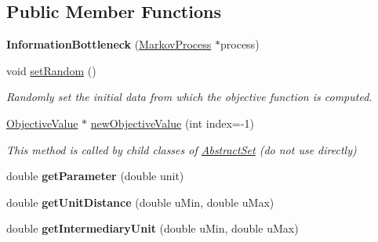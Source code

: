 \subsection*{Public Member Functions}
\begin{DoxyCompactItemize}
\item 
\hypertarget{classInformationBottleneck_aa2b0adc85665a04330d1356bf77097b6}{{\bfseries Information\-Bottleneck} (\hyperlink{classMarkovProcess}{Markov\-Process} $\ast$process)}\label{classInformationBottleneck_aa2b0adc85665a04330d1356bf77097b6}

\item 
\hypertarget{classInformationBottleneck_a10e4ace575f79977f3f6d2f39403dd84}{void \hyperlink{classInformationBottleneck_a10e4ace575f79977f3f6d2f39403dd84}{set\-Random} ()}\label{classInformationBottleneck_a10e4ace575f79977f3f6d2f39403dd84}

\begin{DoxyCompactList}\small\item\em Randomly set the initial data from which the objective function is computed. \end{DoxyCompactList}\item 
\hypertarget{classInformationBottleneck_af710cb93d1be643a5f67c5d879669b8b}{\hyperlink{classObjectiveValue}{Objective\-Value} $\ast$ \hyperlink{classInformationBottleneck_af710cb93d1be643a5f67c5d879669b8b}{new\-Objective\-Value} (int index=-\/1)}\label{classInformationBottleneck_af710cb93d1be643a5f67c5d879669b8b}

\begin{DoxyCompactList}\small\item\em This method is called by child classes of \hyperlink{classAbstractSet}{Abstract\-Set} (do not use directly) \end{DoxyCompactList}\item 
\hypertarget{classInformationBottleneck_ab3ccf81c8633628cd1a4cc37de61a95b}{double {\bfseries get\-Parameter} (double unit)}\label{classInformationBottleneck_ab3ccf81c8633628cd1a4cc37de61a95b}

\item 
\hypertarget{classInformationBottleneck_a2b29527ef1700808f67ceb1b821a1626}{double {\bfseries get\-Unit\-Distance} (double u\-Min, double u\-Max)}\label{classInformationBottleneck_a2b29527ef1700808f67ceb1b821a1626}

\item 
\hypertarget{classInformationBottleneck_a8a7cc07d65482418e1d62b5f84ec2c45}{double {\bfseries get\-Intermediary\-Unit} (double u\-Min, double u\-Max)}\label{classInformationBottleneck_a8a7cc07d65482418e1d62b5f84ec2c45}

\end{DoxyCompactItemize}
